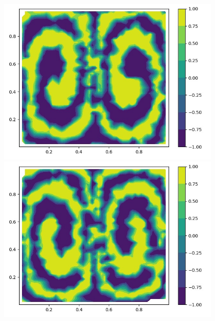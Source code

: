 \documentclass[a4paper, 14pt]{extarticle}
\begin{document}
		\begin{figure}[H]
			\begin{minipage}{0.5\textwidth}
				\centering
				\includegraphics[width = \linewidth]{9.jpg}
			\end{minipage}\hfill
			\begin{minipage}{0.5\textwidth}
				\centering
				\includegraphics[width = \linewidth]{10.jpg}
			\end{minipage}\hfill
		\end{figure}
	
\end{document}
